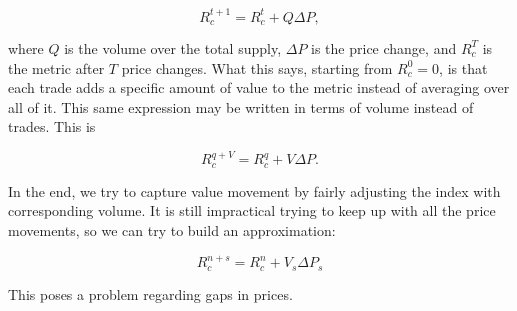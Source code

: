 \documentclass[11pt,a4paper]{article}
\begin{document}
$$
R_c^{t+1} = R_c^{t} + Q \Delta P,
$$

where $Q$ is the volume over the total supply, $\Delta P$ is the price change, and $R_c^{T}$ is the metric after $T$ price changes. What this says, starting from $R_c^{0} = 0$, is that each trade adds a specific amount of value to the metric instead of averaging over all of it. This same expression may be written in terms of volume instead of trades. This is

$$
R_c^{q+V} = R_c^{q} + V \Delta P.
$$

In the end, we try to capture value movement by fairly adjusting the index with corresponding volume. It is still impractical trying to keep up with all the price movements, so we can try to build an approximation:

$$
R_c^{n+s} = R_c^{n} + V_{s} \Delta P_{s}
$$

This poses a problem regarding gaps in prices. 
\end{document}
